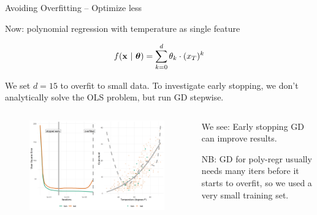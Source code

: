 \documentclass[11pt,compress,t,notes=noshow, xcolor=table]{beamer}
\begin{document}
\begin{vbframe}{Avoiding Overfitting -- Optimize less}

Now: polynomial regression with temperature as single feature 

$$f(\mathbf{x} ~|~ \bm{\theta}) = \sum^{d}_{k=0} \theta_k \cdot (x_T)^{k} $$

We set $d = 15$ to overfit to small data. To investigate early stopping, we don't analytically solve the OLS problem, but run GD stepwise.




\begin{columns}
\begin{column}{0.6\textwidth}
\begin{figure}
\includegraphics[width=1\textwidth]{figure/early_stopping.png}
\end{figure}
\end{column}
\begin{column}{0.4\textwidth}
\lz \lz

We see: Early stopping GD can improve results.

\lz

\footnotesize{NB: GD for poly-regr usually needs many iters before it starts to overfit, so we used a very small training set.}
\end{column}
\end{columns}
    

\end{vbframe}
\end{document}
